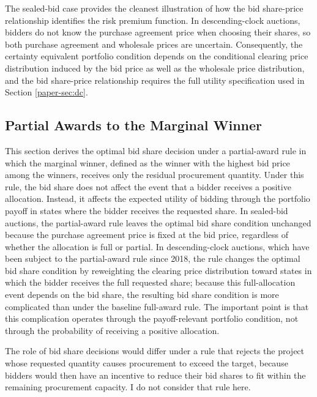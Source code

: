 \documentclass[12pt]{article}
\theoremstyle{definition} %
\begin{document}
The sealed-bid case provides the cleanest illustration of how the bid share-price relationship identifies the risk premium function. In descending-clock auctions, bidders do not know the purchase agreement price when choosing their shares, so both purchase agreement and wholesale prices are uncertain. Consequently, the certainty equivalent portfolio condition depends on the conditional clearing price distribution induced by the bid price as well as the wholesale price distribution, and the bid share-price relationship requires the full utility specification used in Section \ref{paper-sec:dc}.


\subsection{Partial Awards to the Marginal Winner}
\label{sec:winner_partial}

This section derives the optimal bid share decision under a partial-award rule in which the marginal winner, defined as the winner with the highest bid price among the winners, receives only the residual procurement quantity. Under this rule, the bid share does not affect the event that a bidder receives a positive allocation. Instead, it affects the expected utility of bidding through the portfolio payoff in states where the bidder receives the requested share. In sealed-bid auctions, the partial-award rule leaves the optimal bid share condition unchanged because the purchase agreement price is fixed at the bid price, regardless of whether the allocation is full or partial. In descending-clock auctions, which have been subject to the partial-award rule since 2018, the rule changes the optimal bid share condition by reweighting the clearing price distribution toward states in which the bidder receives the full requested share; because this full-allocation event depends on the bid share, the resulting bid share condition is more complicated than under the baseline full-award rule. The important point is that this complication operates through the payoff-relevant portfolio condition, not through the probability of receiving a positive allocation.

The role of bid share decisions would differ under a rule that rejects the project whose requested quantity causes procurement to exceed the target, because bidders would then have an incentive to reduce their bid shares to fit within the remaining procurement capacity. I do not consider that rule here.
\end{document}
